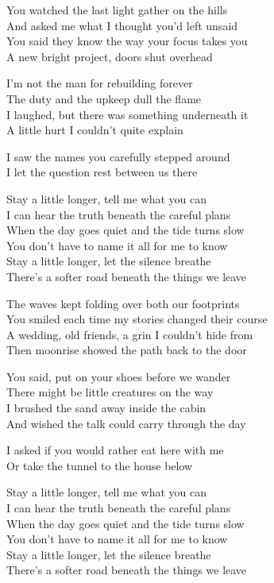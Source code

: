 \begin{lyrics}
You watched the last light gather on the hills\\
And asked me what I thought you’d left unsaid\\
You said they know the way your focus takes you\\
A new bright project, doors shut overhead

I’m not the man for rebuilding forever\\
The duty and the upkeep dull the flame\\
I laughed, but there was something underneath it\\
A little hurt I couldn’t quite explain

I saw the names you carefully stepped around\\
I let the question rest between us there

Stay a little longer, tell me what you can\\
I can hear the truth beneath the careful plans\\
When the day goes quiet and the tide turns slow\\
You don’t have to name it all for me to know\\
Stay a little longer, let the silence breathe\\
There’s a softer road beneath the things we leave

The waves kept folding over both our footprints\\
You smiled each time my stories changed their course\\
A wedding, old friends, a grin I couldn’t hide from\\
Then moonrise showed the path back to the door

You said, put on your shoes before we wander\\
There might be little creatures on the way\\
I brushed the sand away inside the cabin\\
And wished the talk could carry through the day

I asked if you would rather eat here with me\\
Or take the tunnel to the house below

Stay a little longer, tell me what you can\\
I can hear the truth beneath the careful plans\\
When the day goes quiet and the tide turns slow\\
You don’t have to name it all for me to know\\
Stay a little longer, let the silence breathe\\
There’s a softer road beneath the things we leave


\end{lyrics}
